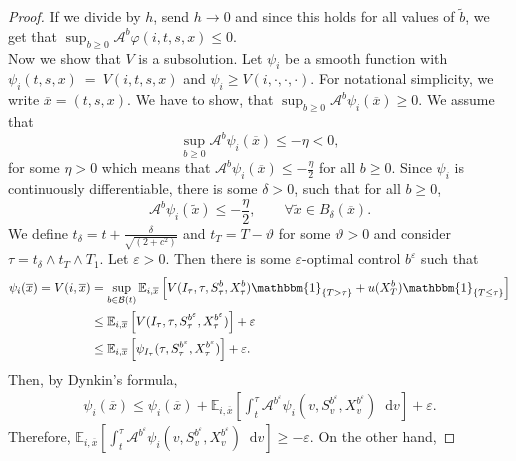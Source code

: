 \documentclass[a4paper]{scrartcl}
\theoremstyle{remark}
\theoremstyle{definition}
\numberwithin{equation}{section}
\newcommand*\diff{\mathop{}\!\mathrm{d}}
\newcommand{\ind}{\mathbbm{1}_}
\begin{document}
\begin{proof}
If we divide by $h$, send $h \rightarrow 0$ and since this holds for all values of $\tilde{b}$, we get that $\sup_{b\geq 0} \mathcal{A}^b \varphi(i,t,s,x)\leq 0$.\\
Now we show that $V$ is a subsolution. Let $\psi_i$ be a smooth function with\\ $\psi_i(t,s,x) ~=~V(i,t,s,x)$ and $\psi_i\geq V(i,\cdot,\cdot,\cdot)$. For notational simplicity, we write $\overline{x}=(t,s,x)$. We have to show, that $\sup_{b\geq 0} \mathcal{A}^b \psi_i(\overline{x})\geq 0$. We assume that 
\begin{equation*}
    \sup_{b\geq 0} \mathcal{A}^b \psi_i(\overline{x})\leq -\eta < 0,
\end{equation*} for some $\eta>0$ which means that $\mathcal{A}^b \psi_i(\overline{x}) \leq -\frac{\eta}{2}$ for all $b\geq 0$. Since $\psi_i$ is continuously differentiable, there is some $\delta>0$, such that for all $b\geq 0$,
\begin{equation*}
   \mathcal{A}^b \psi_i(\tilde{x})\leq -\frac{\eta}{2}, \qquad \forall \tilde{x}\in B_\delta(\overline{x}).
\end{equation*}
We define $t_\delta=t+\frac{\delta}{\sqrt{(2+c^2)}}$ and $t_T=T-\vartheta$ for some $\vartheta>0$ and consider $\tau = t_\delta \wedge t_T \wedge T_1$. Let $\varepsilon>0$. Then there is some $\varepsilon$-optimal control $b^\varepsilon$ such that
\begin{align*}
    \psi_i(\overline{x})=V(i,\overline{x}) &=\sup_{b \in \mathcal{B}(t)} \mathbb{E}_{i,\overline{x}}\left[ V(I_\tau,\tau,S_\tau^b,X_\tau^b) \ind{\{T>\tau\}} + u(X_T^b) \ind{\{T\leq\tau\}}\right]\\
    &\leq  \mathbb{E}_{i,\overline{x}}\left[ V(I_\tau,\tau,S_\tau^{b^{\varepsilon}},X_\tau^{b^{\varepsilon}})\right]+\varepsilon\\
    &\leq  \mathbb{E}_{i,\overline{x}}\left[ \psi_{I_\tau}(\tau,S_\tau^{b^{\varepsilon}},X_\tau^{b^{\varepsilon}})\right] + \varepsilon.
\end{align*}
Then, by Dynkin's formula,
\begin{align*}
    \psi_i(\overline{x}) \leq \psi_i(\overline{x}) + \mathbb{E}_{i,\overline{x}}\left[\int_t^\tau \mathcal{A}^{b^{\varepsilon}} \psi_{i}(v,S_v^{b^{\varepsilon}},X_v^{b^{\varepsilon}}) \diff v  \right] + \varepsilon.
\end{align*}
Therefore, $\mathbb{E}_{i,\overline{x}}\left[\int_t^\tau \mathcal{A}^{b^{\varepsilon}} \psi_{i}(v,S_v^{b^{\varepsilon}},X_v^{b^{\varepsilon}}) \diff v  \right] \geq - \varepsilon$. On the other hand,

\end{proof}
\end{document}
